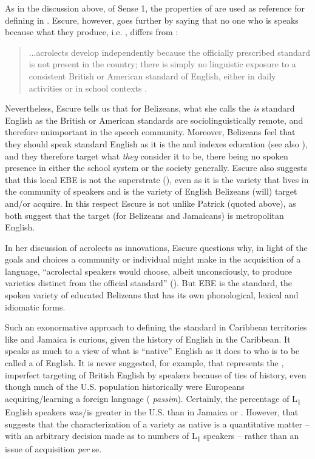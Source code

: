 As in the discussion above, of Sense 1, the properties of  are used as reference for defining  in .  Escure, however, goes further by saying that no one who is  speaks  because what they produce, i.e. , differs from :

\begin{quote} ...acrolects develop independently because the officially prescribed standard is not present in the country; there is simply no linguistic exposure to a consistent British or American standard of English, either in daily activities or in school contexts \citep[73]{Escure1997}.
\end{quote}

Nevertheless, Escure tells us that for Belizeans, what she calls the  \textit{is} standard English as the British or American standards are sociolinguistically remote, and therefore unimportant in the speech community.  Moreover, Belizeans feel that they should speak standard English as it is the  and indexes education (see also \citealt{Young1973}), and they therefore target what \textit{they} consider it to be, there being no spoken  presence in either the school system or the society generally.  Escure also suggests that this local EBE is not the superstrate (\citeyear[74]{Escure1997}), even as it is the variety that lives in the community of speakers and is the variety of English Belizeans (will) target and\slash or acquire.  In this respect Escure is not unlike Patrick (quoted above), as both suggest that the target (for Belizeans and Jamaicans) is metropolitan English.  

In her discussion of acrolects as innovations, Escure questions why, in light of the goals and choices a community or individual might make in the acquisition of a language, “acrolectal speakers would choose, albeit unconsciously, to produce varieties distinct from the official standard” (\citeyear[66]{Escure1997}).  But EBE is the standard, the spoken variety of educated Belizeans that has its own phonological, lexical and idiomatic forms.  

Such an exonormative approach to defining the standard in Caribbean territories like  and Jamaica is curious, given the history of English in the Caribbean.  It speaks as much to a view of what is “native” English as it does to who is to be called a  of English.  It is never suggested, for example, that  represents the , imperfect targeting of British English by speakers because of ties of history, even though much of the U.S. population historically were Europeans acquiring\slash learning a foreign language (\citealt{Romaine2001} \textit{passim}).  Certainly, the percentage of L\textsubscript{1} English speakers was\slash is greater in the U.S. than in Jamaica or .  However, that suggests that the characterization of a variety as native is a quantitative matter – with an arbitrary decision made as to numbers of L\textsubscript{1} speakers – rather than an issue of acquisition \textit{per} se.    


